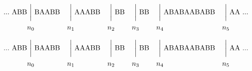 \documentclass{scrartcl}
\newcommand\vertwithin[1]{%
	{\mathmakebox[\widthof{\ensuremath{{}#1{}}}][c]{{\biggm\vert}}}}%
\begin{document}
	
	\begin{align}
		... \  \text{ABB} & \vertwithin{n_0} \text{BAABB} & & \vertwithin{n_1} \text{AAABB}& &\vertwithin{n_2} \text{BB} & & \vertwithin{n_3} \text{BB} & & \vertwithin{n_4} \text{ABABAABABB} & & \vertwithin{n_5} \text{AA} \   ... \\
		& n_0 & & n_1 & & n_2 & & n_3 & & n_4 & & n_5 \\
	\end{align}
	
	\begin{alignat}{6}
		... \  \text{ABB} & \vertwithin{n_0} \text{BAABB} & & \vertwithin{n_1} \text{AAABB}& & \vertwithin{n_2} \text{BB} & & \vertwithin{n_3} \text{BB} & & \vertwithin{n_4} \text{ABABAABABB} & & \vertwithin{n_5} \text{AA} \  ... \\
		& n_0 & & n_1 & & n_2 & & n_3 & & n_4 & & n_5 \\
	\end{alignat}
	
\end{document}
